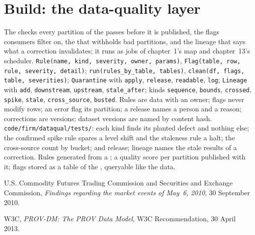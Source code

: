 \section{Build: the data-quality layer}\label{bld:pl:data-quality-and-lineage:dataqual}

\begin{build}
 The checks every partition of the  passes before it is published, the flags consumers filter on, the
 that withholds bad partitions, and the lineage that says what a correction invalidates; it runs as jobs of chapter~1's
map and chapter~13's scheduler.
 \texttt{Rule(name, kind, severity, owner, params)}, \texttt{Flag(table, row, rule, severity, detail)};
\texttt{run(rules\_by\_table, tables)}, \texttt{clean(df, flags, table, severities)}; \texttt{Quarantine} with \texttt{apply},
\texttt{release}, \texttt{readable}, \texttt{log}; \texttt{Lineage} with \texttt{add}, \texttt{downstream}, \texttt{upstream},
\texttt{stale\_after}; kinds \texttt{sequence}, \texttt{bounds}, \texttt{crossed}, \texttt{spike}, \texttt{stale},
\texttt{cross\_source}, \texttt{busted}.
 Rules are data with an owner; flags never modify rows; an error flag  its partition; a release names a
person and a reason; corrections are versions; dataset versions are named by content hash.
 \texttt{code/firm/dataqual/tests/}: each kind finds its planted defect and nothing else; the confirmed spike
rule spares a level shift and the staleness rule a halt; the cross-source count by bucket;  and release; lineage names the
stale results of a correction.
 Rules generated from a ; a quality score per partition published with it; flags stored as a table of
the , queryable like the data.
\end{build}

\begin{omsources}
\item U.S. Commodity Futures Trading Commission and Securities and Exchange Commission, \emph{Findings regarding the market events
of May~6, 2010}, 30 September 2010.
\item W3C, \emph{PROV-DM: The PROV Data Model}, W3C Recommendation, 30 April 2013.
\end{omsources}


